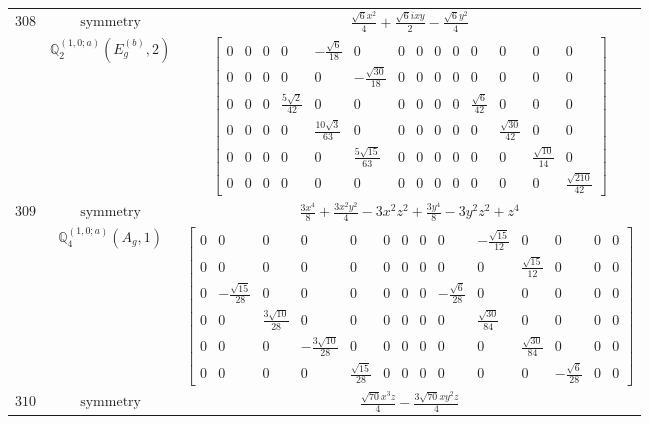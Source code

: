 \documentclass[fleqn,8pt,landscape]{jsarticle}
\begin{document}
\begin{longtable}{ccc}
$ 308 $ & $ \text{symmetry} $ & $ \frac{\sqrt{6} x^{2}}{4} + \frac{\sqrt{6} i x y}{2} - \frac{\sqrt{6} y^{2}}{4} $ \\
$  $ & $ \mathbb{Q}_{2}^{(1,0;a)}(E_{g}^{(b)},2) $ & $ \begin{bmatrix} 0 & 0 & 0 & 0 & - \frac{\sqrt{6}}{18} & 0 & 0 & 0 & 0 & 0 & 0 & 0 & 0 & 0 \\ 0 & 0 & 0 & 0 & 0 & - \frac{\sqrt{30}}{18} & 0 & 0 & 0 & 0 & 0 & 0 & 0 & 0 \\ 0 & 0 & 0 & \frac{5 \sqrt{2}}{42} & 0 & 0 & 0 & 0 & 0 & 0 & \frac{\sqrt{6}}{42} & 0 & 0 & 0 \\ 0 & 0 & 0 & 0 & \frac{10 \sqrt{3}}{63} & 0 & 0 & 0 & 0 & 0 & 0 & \frac{\sqrt{30}}{42} & 0 & 0 \\ 0 & 0 & 0 & 0 & 0 & \frac{5 \sqrt{15}}{63} & 0 & 0 & 0 & 0 & 0 & 0 & \frac{\sqrt{10}}{14} & 0 \\ 0 & 0 & 0 & 0 & 0 & 0 & 0 & 0 & 0 & 0 & 0 & 0 & 0 & \frac{\sqrt{210}}{42} \end{bmatrix} $ \\ \hline
$ 309 $ & $ \text{symmetry} $ & $ \frac{3 x^{4}}{8} + \frac{3 x^{2} y^{2}}{4} - 3 x^{2} z^{2} + \frac{3 y^{4}}{8} - 3 y^{2} z^{2} + z^{4} $ \\
$  $ & $ \mathbb{Q}_{4}^{(1,0;a)}(A_{g},1) $ & $ \begin{bmatrix} 0 & 0 & 0 & 0 & 0 & 0 & 0 & 0 & 0 & - \frac{\sqrt{15}}{12} & 0 & 0 & 0 & 0 \\ 0 & 0 & 0 & 0 & 0 & 0 & 0 & 0 & 0 & 0 & \frac{\sqrt{15}}{12} & 0 & 0 & 0 \\ 0 & - \frac{\sqrt{15}}{28} & 0 & 0 & 0 & 0 & 0 & 0 & - \frac{\sqrt{6}}{28} & 0 & 0 & 0 & 0 & 0 \\ 0 & 0 & \frac{3 \sqrt{10}}{28} & 0 & 0 & 0 & 0 & 0 & 0 & \frac{\sqrt{30}}{84} & 0 & 0 & 0 & 0 \\ 0 & 0 & 0 & - \frac{3 \sqrt{10}}{28} & 0 & 0 & 0 & 0 & 0 & 0 & \frac{\sqrt{30}}{84} & 0 & 0 & 0 \\ 0 & 0 & 0 & 0 & \frac{\sqrt{15}}{28} & 0 & 0 & 0 & 0 & 0 & 0 & - \frac{\sqrt{6}}{28} & 0 & 0 \end{bmatrix} $ \\ \hline
$ 310 $ & $ \text{symmetry} $ & $ \frac{\sqrt{70} x^{3} z}{4} - \frac{3 \sqrt{70} x y^{2} z}{4} $ \\

\end{longtable}
\end{document}
